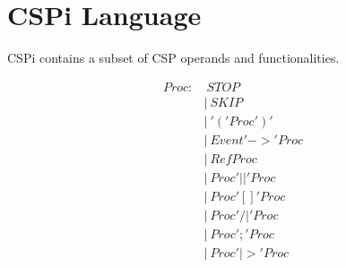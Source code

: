 \documentclass{comjnl}
\begin{document}
\section{CSPi Language}
CSPi contains a subset of CSP operands and functionalities. 


\begin{align}
Proc    :&\> STOP             \\
        &|\> SKIP             \\
        &|\> '(' Proc ')'     \\
        &|\> Event '->' Proc  \\
        &|\> RefProc          \\
        &|\> Proc '||' Proc   \\
        &|\> Proc '[]' Proc   \\
        &|\> Proc '/|' Proc   \\
        &|\> Proc ';' Proc    \\
        &|\> Proc '|>' Proc   \\
\end{align}



\end{document}
